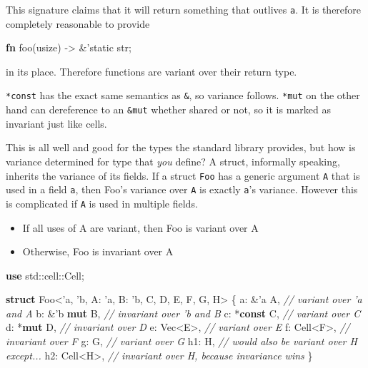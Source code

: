 \documentclass[a4paper,]{book}
\newenvironment{Shaded}{\begin{snugshade}}{\end{snugshade}}
\newcommand{\KeywordTok}[1]{\textcolor[rgb]{0.13,0.29,0.53}{\textbf{{#1}}}}
\newcommand{\DataTypeTok}[1]{\textcolor[rgb]{0.13,0.29,0.53}{{#1}}}
\newcommand{\CommentTok}[1]{\textcolor[rgb]{0.56,0.35,0.01}{\textit{{#1}}}}
\newcommand{\OtherTok}[1]{\textcolor[rgb]{0.56,0.35,0.01}{{#1}}}
\newcommand{\NormalTok}[1]{{#1}}
\providecommand{\tightlist}{%
  \setlength{\itemsep}{0pt}\setlength{\parskip}{0pt}}
\begin{document}
This signature claims that it will return something that outlives
\texttt{\textquotesingle{}a}. It is therefore completely reasonable to
provide

\begin{Shaded}
\begin{Highlighting}[]
\KeywordTok{fn} \NormalTok{foo(}\DataTypeTok{usize}\NormalTok{) -> &}\OtherTok{'static} \DataTypeTok{str}\NormalTok{;}
\end{Highlighting}
\end{Shaded}

in its place. Therefore functions are variant over their return type.

\texttt{*const} has the exact same semantics as \texttt{\&}, so variance
follows. \texttt{*mut} on the other hand can dereference to an
\texttt{\&mut} whether shared or not, so it is marked as invariant just
like cells.

This is all well and good for the types the standard library provides,
but how is variance determined for type that \emph{you} define? A
struct, informally speaking, inherits the variance of its fields. If a
struct \texttt{Foo} has a generic argument \texttt{A} that is used in a
field \texttt{a}, then Foo's variance over \texttt{A} is exactly
\texttt{a}'s variance. However this is complicated if \texttt{A} is used
in multiple fields.

\begin{itemize}
\tightlist
\item
  If all uses of A are variant, then Foo is variant over A
\item
  Otherwise, Foo is invariant over A
\end{itemize}

\begin{Shaded}
\begin{Highlighting}[]
\KeywordTok{use} \NormalTok{std::cell::Cell;}

\KeywordTok{struct} \NormalTok{Foo<}\OtherTok{'a}\NormalTok{, }\OtherTok{'b}\NormalTok{, A: }\OtherTok{'a}\NormalTok{, B: }\OtherTok{'b}\NormalTok{, C, D, E, F, G, H> \{}
    \NormalTok{a: &}\OtherTok{'a} \NormalTok{A,     }\CommentTok{// variant over 'a and A}
    \NormalTok{b: &}\OtherTok{'b} \KeywordTok{mut} \NormalTok{B, }\CommentTok{// invariant over 'b and B}
    \NormalTok{c: *}\KeywordTok{const} \NormalTok{C,  }\CommentTok{// variant over C}
    \NormalTok{d: *}\KeywordTok{mut} \NormalTok{D,    }\CommentTok{// invariant over D}
    \NormalTok{e: }\DataTypeTok{Vec}\NormalTok{<E>,    }\CommentTok{// variant over E}
    \NormalTok{f: Cell<F>,   }\CommentTok{// invariant over F}
    \NormalTok{g: G,         }\CommentTok{// variant over G}
    \NormalTok{h1: H,        }\CommentTok{// would also be variant over H except...}
    \NormalTok{h2: Cell<H>,  }\CommentTok{// invariant over H, because invariance wins}
\NormalTok{\}}
\end{Highlighting}
\end{Shaded}
\end{document}
